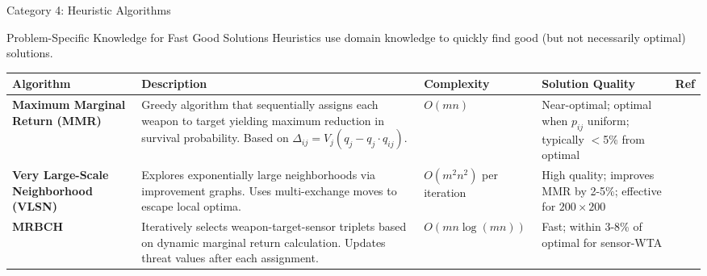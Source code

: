 \documentclass[aspectratio=43,8pt]{beamer}
\begin{document}
\begin{frame}{Category 4: Heuristic Algorithms}
\begin{block}{Problem-Specific Knowledge for Fast Good Solutions}
Heuristics use domain knowledge to quickly find good (but not necessarily optimal) solutions.
\end{block}

\vspace{0.2cm}
\begin{table}[h]
\centering
\small
\begin{tabular}{p{1.6cm}p{3.6cm}p{1.5cm}p{1.8cm}p{0.9cm}}
\toprule
\textbf{Algorithm} & \textbf{Description} & \textbf{Complexity} & \textbf{Solution Quality} & \textbf{Ref} \\
\midrule
\textbf{Maximum Marginal Return (MMR)} & Greedy algorithm that sequentially assigns each weapon to target yielding maximum reduction in survival probability. Based on $\Delta_{ij} = V_j(q_j - q_j \cdot q_{ij})$. & $O(mn)$ & \textcolor{accentgreen}{Near-optimal}; optimal when $p_{ij}$ uniform; typically $<$5\% from optimal & \cite{ahuja2007,intechopen2020} \\
\addlinespace
\textbf{Very Large-Scale Neighborhood (VLSN)} & Explores exponentially large neighborhoods via improvement graphs. Uses multi-exchange moves to escape local optima. & $O(m^2n^2)$ per iteration & High quality; improves MMR by 2-5\%; effective for $200 \times 200$ & \cite{ahuja2007} \\
\addlinespace
\textbf{MRBCH} & Iteratively selects weapon-target-sensor triplets based on dynamic marginal return calculation. Updates threat values after each assignment. & $O(mn \log(mn))$ & Fast; within 3-8\% of optimal for sensor-WTA & \cite{xin2018} \\
\bottomrule
\end{tabular}
\end{table}

\end{frame}
\end{document}
